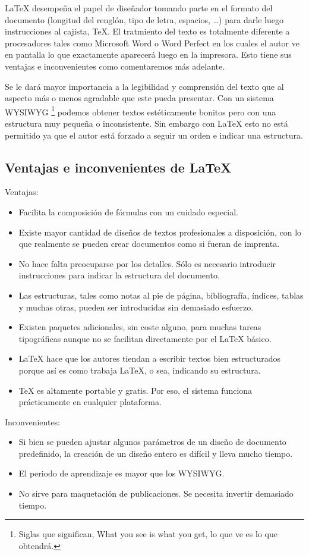 		\LaTeX{} desempe\~na el papel de dise\~nador tomando parte en el formato del documento (longitud del rengl\'on, tipo de letra, espacios, \ldots) para darle luego instrucciones al cajista, \TeX{}.	El tratmiento del texto es totalmente diferente a procesadores tales como Microsoft Word o Word Perfect en los cuales el autor ve en pantalla lo que exactamente aparecer\'a luego en la impresora. Esto tiene sus ventajas e inconvenientes como comentaremos m\'as adelante.
		
		Se le dar\'a mayor importancia a la legibilidad y comprensi\'on del texto que al aspecto m\'as o menos agradable que este pueda presentar. Con un sistema WYSIWYG \footnote{Siglas que significan, What you see is what you get, lo que ve es lo que obtendr\'a.} podemos obtener textos est\'eticamente bonitos pero con una estructura muy peque\~na o inconsistente. Sin embargo con \LaTeX{} esto no est\'a permitido ya que el autor est\'a forzado a seguir un orden e indicar una estructura.

\subsection{Ventajas e inconvenientes de \LaTeX{}}%
Ventajas:

\begin{itemize}
	\item Facilita la composici\'on de f\'ormulas con un cuidado especial. 
	\item Existe mayor cantidad de dise\~nos de textos profesionales a disposici\'on, con lo que realmente se pueden crear  documentos como si fueran de imprenta.
	\item No hace falta preocuparse por los detalles. S\'olo es necesario introducir instrucciones para indicar la estructura del documento.
	\item Las estructuras, tales como notas al pie de p\'agina, bibliograf\'ia, \'indices, tablas y muchas otras, pueden ser introducidas sin demasiado esfuerzo. 
	\item Existen paquetes adicionales, sin coste alguno, para muchas tareas tipogr\'aficas aunque no se facilitan directamente por el \LaTeX{} b\'asico.
	\item \LaTeX{} hace que los autores tiendan a escribir textos bien estructurados porque as\'i es como trabaja \LaTeX{}, o sea, indicando su estructura.
	\item \TeX{} es altamente portable y gratis. Por eso, el sistema funciona pr\'acticamente en cualquier plataforma.
\end{itemize}


Inconvenientes:

\begin{itemize} 
	\item Si bien se pueden ajustar algunos par\'ametros de un dise\~no de documento predefinido, la creaci\'on de un dise\~no entero es dif\'icil y lleva mucho tiempo. 
	\item El periodo de aprendizaje es mayor que los WYSIWYG.	
	\item No sirve para maquetaci\'on de publicaciones. Se necesita
invertir demasiado tiempo.
\end{itemize}